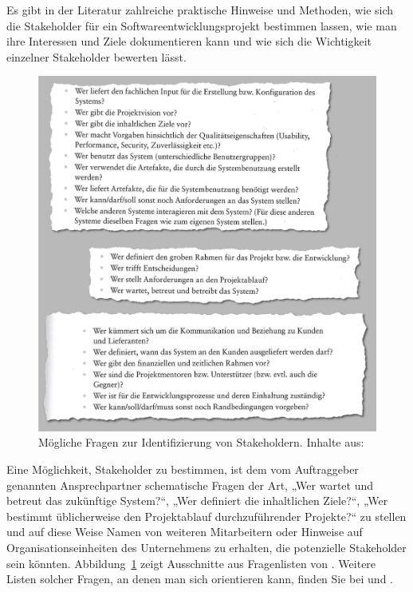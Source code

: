 Es gibt in der Literatur zahlreiche praktische Hinweise und Methoden, wie sich die Stakeholder für ein Softwareentwicklungsprojekt bestimmen lassen, wie man ihre Interessen und Ziele dokumentieren kann und wie sich die Wichtigkeit einzelner Stakeholder bewerten lässt.

\begin{figure}[h!]
	\centering
	\includegraphics[width=\textwidth]{Bilder/Kapitel-6/Stakeholder_Medley_V2.png}
	\caption[Mögliche Fragen zur Identifizierung von Stakeholdern]{Mögliche Fragen zur Identifizierung von Stakeholdern. Inhalte aus: \cite[84 \psq]{ber18}}
	\label{fig:stakeholder_medley}
	
	\vspace{\baselineskip} %
\end{figure}

Eine Möglichkeit, Stakeholder zu bestimmen, ist dem vom Auftraggeber genannten Ansprechpartner schematische Fragen der Art, „Wer wartet und betreut das zukünftige System?“, „Wer definiert die inhaltlichen Ziele?“, „Wer bestimmt üblicherweise den Projektablauf durchzuführender Projekte?“ zu stellen und auf diese Weise \mbox{Namen} von weiteren Mitarbeitern oder Hinweise auf Organisationseinheiten des Unternehmens zu erhalten, die potenzielle Stakeholder sein könnten. Abbildung~\ref{fig:stakeholder_medley} zeigt Ausschnitte aus Fragenlisten von \cite[84 \psq]{ber18}. Weitere Listen solcher Fragen, an denen man sich orientieren kann, finden Sie bei \cite[36]{lap17} und \cite[122 \psqq]{lef11}.

